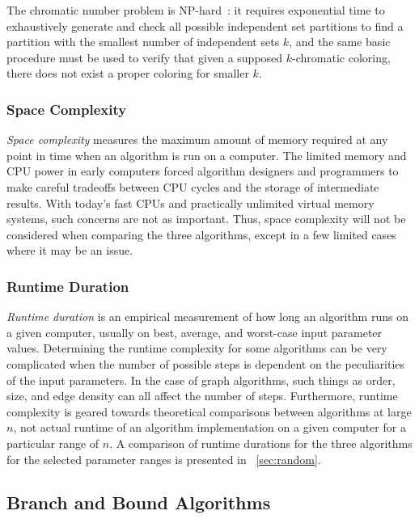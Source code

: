 The chromatic number problem is NP-hard~\cite{mcdiarmid}: it requires exponential time to exhaustively generate and
check all possible independent set partitions to find a partition with the smallest number of independent sets
\(k\), and the same basic procedure must be used to verify that given a supposed \(k\)-chromatic coloring, there
does not exist a proper coloring for smaller \(k\).

\subsubsection{Space Complexity}\label{sec:sub:sub:space}

\emph{Space complexity} measures the maximum amount of memory required at any point in time when an algorithm is
run on a computer.  The limited memory and CPU power in early computers forced algorithm designers and programmers
to make careful tradeoffs between CPU cycles and the storage of intermediate results.  With today's fast CPUs and
practically unlimited virtual memory systems, such concerns are not as important.  Thus, space complexity will not
be considered when comparing the three algorithms, except in a few limited cases where it may be an issue.

\subsubsection{Runtime Duration}\label{sec:sub:sub:duration}

\emph{Runtime duration} is an empirical measurement of how long an algorithm runs on a given computer, usually on
best, average, and worst-case input parameter values.  Determining the runtime complexity for some algorithms can
be very complicated when the number of possible steps is dependent on the peculiarities of the input parameters.
In the case of graph algorithms, such things as order, size, and edge density can all affect the number of steps.
Furthermore, runtime complexity is geared towards theoretical comparisons between algorithms at large \(n\), not
actual runtime of an algorithm implementation on a given computer for a particular range of \(n\).  A comparison of
runtime durations for the three algorithms for the selected parameter ranges is presented in
\sectionname~\ref{sec:random}.

\subsection{Branch and Bound Algorithms}\label{sec:sub:bandb}

